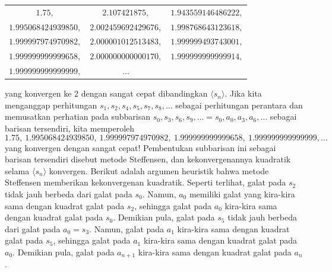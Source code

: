 \begin{center}
\begin{tabular}{ccc}
$1.75,$ & $2.107421875,$ & $1.943559146486222,$\tabularnewline
$1.995068424939850,$ & $2.002459692429676,$ & $1.998768643123618,$\tabularnewline
$1.999997974970982,$ & $2.000001012513483,$ & $1.999999493743001,$\tabularnewline
$1.999999999999658,$ & $2.000000000000170,$ & $1.999999999999914,$\tabularnewline
$1.999999999999999,$ & $\ldots$ & \tabularnewline
\end{tabular}
\par\end{center}

\noindent yang konvergen ke 2 dengan sangat cepat dibandingkan $\langle s_{n}\rangle$.
Jika kita menganggap perhitungan $s_{1},s_{2},s_{4},s_{5},s_{7},s_{8},\ldots$
sebagai perhitungan perantara dan memusatkan perhatian pada subbarisan
$s_{0},s_{3},s_{6},s_{9},\ldots=s_{0},a_{0},a_{3},a_{6},\ldots$ sebagai
barisan tersendiri, kita memperoleh 
\[
1.75,\ 1.995068424939850,\ 1.999997974970982,\ 1.999999999999658,\ 1.999999999999999,\ldots
\]
yang konvergen dengan sangat cepat! Pembentukan subbarisan ini sebagai
barisan tersendiri disebut 
metode Steffensen, dan kekonvergenannya kuadratik selama $\langle s_{n}\rangle$
konvergen. Berikut adalah argumen heuristik bahwa metode Steffensen
memberikan kekonvergenan kuadratik. Seperti terlihat, galat pada $s_{2}$
tidak jauh berbeda dari galat pada $s_{0}$. Namun, $a_{0}$ memiliki
galat yang kira-kira sama dengan kuadrat galat pada $s_{2}$, sehingga
galat pada $a_{0}$ kira-kira sama dengan kuadrat galat pada $s_{0}$.
Demikian pula, galat pada $s_{5}$ tidak jauh berbeda dari galat pada
$a_{0}=s_{3}$. Namun, galat pada $a_{1}$ kira-kira sama dengan kuadrat
galat pada $s_{5}$, sehingga galat pada $a_{1}$ kira-kira sama dengan
kuadrat galat pada $a_{0}$. Demikian pula, galat pada $a_{n+1}$
kira-kira sama dengan kuadrat galat pada $a_{n}$.

